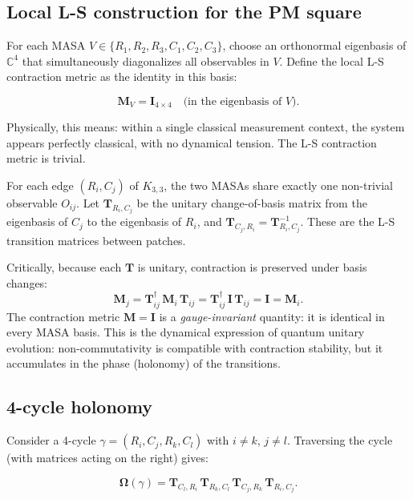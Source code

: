 \documentclass[11pt]{article}
\begin{document}
\subsection{Local L-S construction for the PM square}
\label{sec:local-ls}

For each MASA $V \in \{R_1,R_2,R_3,C_1,C_2,C_3\}$, choose an orthonormal eigenbasis
of $\mathbb{C}^4$ that simultaneously diagonalizes all observables in $V$.
Define the local L-S contraction metric as the identity in this basis:

\begin{equation}\label{eq:local-M}
\mathbf{M}_V = \mathbf{I}_{4\times 4} \quad \text{(in the eigenbasis of $V$)}.
\end{equation}

Physically, this means: within a single classical measurement context, the system
appears perfectly classical, with no dynamical tension. The L-S contraction metric
is trivial.

For each edge $(R_i, C_j)$ of $K_{3,3}$, the two MASAs share exactly one non-trivial
observable $O_{ij}$. Let $\mathbf{T}_{R_i, C_j}$ be the unitary change-of-basis matrix
from the eigenbasis of $C_j$ to the eigenbasis of $R_i$, and
$\mathbf{T}_{C_j, R_i} = \mathbf{T}_{R_i, C_j}^{-1}$. These are the L-S transition
matrices between patches.

Critically, because each $\mathbf{T}$ is unitary, contraction is preserved under
basis changes:
\begin{equation}\label{eq:contraction-invariant}
\mathbf{M}_j = \mathbf{T}_{ij}^\dagger \,\mathbf{M}_i \,\mathbf{T}_{ij}
= \mathbf{T}_{ij}^\dagger \,\mathbf{I} \,\mathbf{T}_{ij}
= \mathbf{I} = \mathbf{M}_i.
\end{equation}
The contraction metric $\mathbf{M} = \mathbf{I}$ is a \emph{gauge-invariant}
quantity: it is identical in every MASA basis. This is the dynamical expression
of quantum unitary evolution: non-commutativity is compatible with contraction
stability, but it accumulates in the phase (holonomy) of the transitions.

\subsection{4-cycle holonomy}
\label{sec:4h-proof}

Consider a 4-cycle $\gamma = (R_i, C_j, R_k, C_l)$ with $i \neq k$, $j \neq l$.
Traversing the cycle (with matrices acting on the right) gives:

\begin{equation}\label{eq:omega-cycle}
\mathbf{\Omega}(\gamma) = \mathbf{T}_{C_l, R_i} \,\mathbf{T}_{R_k, C_l}
\,\mathbf{T}_{C_j, R_k} \,\mathbf{T}_{R_i, C_j}.
\end{equation}
\end{document}

